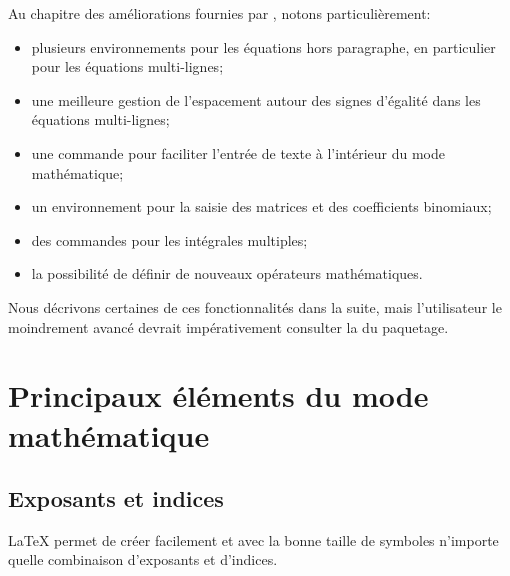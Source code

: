Au chapitre des améliorations fournies par , notons
particulièrement:
\begin{itemize}
\item plusieurs environnements pour les équations hors paragraphe, en
  particulier pour les équations multi-lignes;
\item une meilleure gestion de l'espacement autour des signes
  d'égalité dans les équations multi-lignes;
\item une commande pour faciliter l'entrée de texte à l'intérieur du
  mode mathématique;
\item un environnement pour la saisie des matrices et des coefficients
  binomiaux;
\item des commandes pour les intégrales multiples;
\item la possibilité de définir de nouveaux opérateurs mathématiques.
\end{itemize}
Nous décrivons certaines de ces fonctionnalités dans la suite, mais
l'utilisateur le moindrement avancé devrait impérativement consulter
la %
du paquetage.


\section{Principaux éléments du mode mathématique}
\label{sec:math:bases}

\subsection{Exposants et indices}
\label{sec:math:bases:exposants}

{\LaTeX} permet de créer facilement et avec la bonne taille de
symboles n'importe quelle combinaison d'exposants et d'indices.


